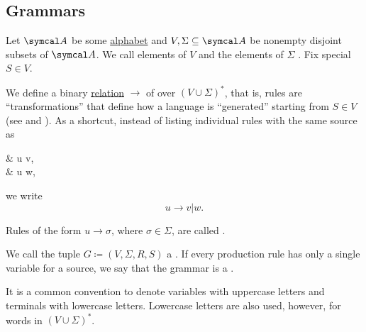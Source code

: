 \subsection{Grammars}\label{subsec:grammars}

\begin{definition}\label{def:grammar}
  Let \( \Cal{A} \) be some \hyperref[def:language]{alphabet} and \( V, \Sigma \subseteq \Cal{A} \) be nonempty disjoint subsets of \( \Cal{A} \). We call elements of \( V \)  and the elements of \( \Sigma \) . Fix special  \( S \in V \).

  We define a binary \hyperref[def:relation]{relation} \( \to \) of  over \( (V \cup \Sigma)^* \), that is, rules are \enquote{transformations} that define how a language is \enquote{generated} starting from \( S \in V \) (see  and ). As a shortcut, instead of listing individual rules with the same source as
  \begin{BreakableAlign*}
     & u \to v, \\
     & u \to w,
  \end{BreakableAlign*}
  we write
  \begin{equation*}
    u \to v | w.
  \end{equation*}

  Rules of the form \( u \to \sigma \), where \( \sigma \in \Sigma \), are called .

  We call the tuple \( G \coloneqq (V, \Sigma, R, S) \) a . If every production rule has only a single variable for a source, we say that the grammar is a .
\end{definition}

\begin{remark}\label{remark:grammar_symbol_case}
  It is a common convention to denote variables with uppercase letters and terminals with lowercase letters. Lowercase letters are also used, however, for words in \( (V \cup \Sigma)^* \).
\end{remark}

